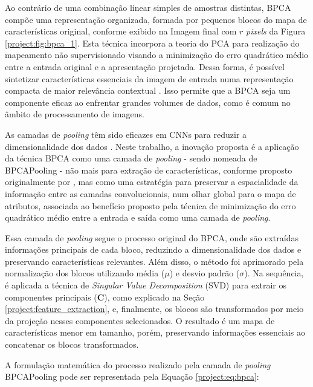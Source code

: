 Ao contrário de uma combinação linear simples de amostras distintas, BPCA compõe uma representação organizada, formada por pequenos blocos do mapa de características original, conforme exibido na Imagem final com $r$ \textit{pixels} da Figura \ref{project:fig:bpca_1}. Esta técnica incorpora a teoria do PCA para realização do mapeamento não supervisionado visando a minimização do erro quadrático médio entre a entrada original e a apresentação projetada. Dessa forma, é possível sintetizar características essenciais da imagem de entrada numa representação compacta de maior relevância contextual \citep{Kuncheva2014PCAData}. Isso permite que a BPCA seja um componente eficaz ao enfrentar grandes volumes de dados, como é comum no âmbito de processamento de imagens.

As camadas de \textit{pooling} têm sido eficazes em CNNs para reduzir a dimensionalidade dos dados \citep{Paul2019DimensionalityPooling}. Neste trabalho, a inovação proposta é a aplicação da técnica BPCA como uma camada de \textit{pooling} - sendo nomeada de BPCAPooling - não mais para extração de características, conforme proposto originalmente por \cite{Salvadeo2011}, mas como uma estratégia para preservar a espacialidade da informação entre as camadas convolucionais, num olhar global para o mapa de atributos, associada ao benefício proposto pela técnica de minimização do erro quadrático médio entre a entrada e saída como uma camada de \textit{pooling}.

Essa camada de \textit{pooling} segue o processo original do BPCA, onde são extraídas informações principais de cada bloco, reduzindo a dimensionalidade dos dados e preservando características relevantes. Além disso, o método foi aprimorado pela normalização dos blocos utilizando média ($\mu$) e desvio padrão ($\sigma$). Na sequência, é aplicada a técnica de \textit{Singular Value Decomposition} (SVD) para extrair os componentes principais ($\boldsymbol{C}$), como explicado na Seção \ref{project:feature_extraction}, e, finalmente, os blocos são transformados por meio da projeção nesses componentes selecionados. O resultado é um mapa de características menor em tamanho, porém, preservando informações essenciais ao concatenar os blocos transformados.

A formulação matemática do processo realizado pela camada de \textit{pooling} BPCAPooling pode ser representada pela Equação \ref{project:eq:bpca}:

